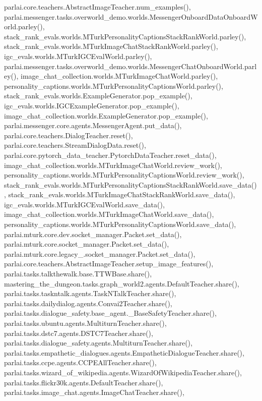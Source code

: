 parlai.\+core.\+teachers.\+Abstract\+Image\+Teacher.\+num\+\_\+examples(), parlai.\+messenger.\+tasks.\+overworld\+\_\+demo.\+worlds.\+Messenger\+Onboard\+Data\+Onboard\+World.\+parley(), stack\+\_\+rank\+\_\+evals.\+worlds.\+M\+Turk\+Personality\+Captions\+Stack\+Rank\+World.\+parley(), stack\+\_\+rank\+\_\+evals.\+worlds.\+M\+Turk\+Image\+Chat\+Stack\+Rank\+World.\+parley(), igc\+\_\+evals.\+worlds.\+M\+Turk\+I\+G\+C\+Eval\+World.\+parley(), parlai.\+messenger.\+tasks.\+overworld\+\_\+demo.\+worlds.\+Messenger\+Chat\+Onboard\+World.\+parley(), image\+\_\+chat\+\_\+collection.\+worlds.\+M\+Turk\+Image\+Chat\+World.\+parley(), personality\+\_\+captions.\+worlds.\+M\+Turk\+Personality\+Captions\+World.\+parley(), stack\+\_\+rank\+\_\+evals.\+worlds.\+Example\+Generator.\+pop\+\_\+example(), igc\+\_\+evals.\+worlds.\+I\+G\+C\+Example\+Generator.\+pop\+\_\+example(), image\+\_\+chat\+\_\+collection.\+worlds.\+Example\+Generator.\+pop\+\_\+example(), parlai.\+messenger.\+core.\+agents.\+Messenger\+Agent.\+put\+\_\+data(), parlai.\+core.\+teachers.\+Dialog\+Teacher.\+reset(), parlai.\+core.\+teachers.\+Stream\+Dialog\+Data.\+reset(), parlai.\+core.\+pytorch\+\_\+data\+\_\+teacher.\+Pytorch\+Data\+Teacher.\+reset\+\_\+data(), image\+\_\+chat\+\_\+collection.\+worlds.\+M\+Turk\+Image\+Chat\+World.\+review\+\_\+work(), personality\+\_\+captions.\+worlds.\+M\+Turk\+Personality\+Captions\+World.\+review\+\_\+work(), stack\+\_\+rank\+\_\+evals.\+worlds.\+M\+Turk\+Personality\+Captions\+Stack\+Rank\+World.\+save\+\_\+data(), stack\+\_\+rank\+\_\+evals.\+worlds.\+M\+Turk\+Image\+Chat\+Stack\+Rank\+World.\+save\+\_\+data(), igc\+\_\+evals.\+worlds.\+M\+Turk\+I\+G\+C\+Eval\+World.\+save\+\_\+data(), image\+\_\+chat\+\_\+collection.\+worlds.\+M\+Turk\+Image\+Chat\+World.\+save\+\_\+data(), personality\+\_\+captions.\+worlds.\+M\+Turk\+Personality\+Captions\+World.\+save\+\_\+data(), parlai.\+mturk.\+core.\+dev.\+socket\+\_\+manager.\+Packet.\+set\+\_\+data(), parlai.\+mturk.\+core.\+socket\+\_\+manager.\+Packet.\+set\+\_\+data(), parlai.\+mturk.\+core.\+legacy\+\_.\+socket\+\_\+manager.\+Packet.\+set\+\_\+data(), parlai.\+core.\+teachers.\+Abstract\+Image\+Teacher.\+setup\+\_\+image\+\_\+features(), parlai.\+tasks.\+talkthewalk.\+base.\+T\+T\+W\+Base.\+share(), mastering\+\_\+the\+\_\+dungeon.\+tasks.\+graph\+\_\+world2.\+agents.\+Default\+Teacher.\+share(), parlai.\+tasks.\+taskntalk.\+agents.\+Task\+N\+Talk\+Teacher.\+share(), parlai.\+tasks.\+dailydialog.\+agents.\+Convai2\+Teacher.\+share(), parlai.\+tasks.\+dialogue\+\_\+safety.\+base\+\_\+agent.\+\_\+\+Base\+Safety\+Teacher.\+share(), parlai.\+tasks.\+ubuntu.\+agents.\+Multiturn\+Teacher.\+share(), parlai.\+tasks.\+dstc7.\+agents.\+D\+S\+T\+C7\+Teacher.\+share(), parlai.\+tasks.\+dialogue\+\_\+safety.\+agents.\+Multiturn\+Teacher.\+share(), parlai.\+tasks.\+empathetic\+\_\+dialogues.\+agents.\+Empathetic\+Dialogue\+Teacher.\+share(), parlai.\+tasks.\+ccpe.\+agents.\+C\+C\+P\+E\+All\+Teacher.\+share(), parlai.\+tasks.\+wizard\+\_\+of\+\_\+wikipedia.\+agents.\+Wizard\+Of\+Wikipedia\+Teacher.\+share(), parlai.\+tasks.\+flickr30k.\+agents.\+Default\+Teacher.\+share(), parlai.\+tasks.\+image\+\_\+chat.\+agents.\+Image\+Chat\+Teacher.\+share(), 